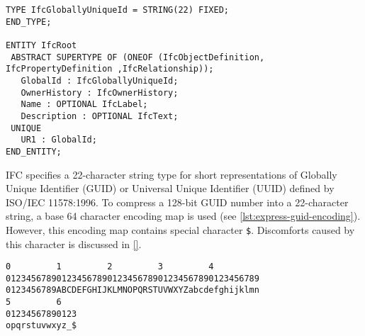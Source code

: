 \begin{lstlisting}[caption={Definition and use of type \texttt{IfcGloballyUniqueId}},label=lst:express-guid]
TYPE IfcGloballyUniqueId = STRING(22) FIXED;
END_TYPE;

ENTITY IfcRoot
 ABSTRACT SUPERTYPE OF (ONEOF (IfcObjectDefinition, IfcPropertyDefinition ,IfcRelationship));
   GlobalId : IfcGloballyUniqueId;
   OwnerHistory : IfcOwnerHistory;
   Name : OPTIONAL IfcLabel;
   Description : OPTIONAL IfcText;
 UNIQUE
   UR1 : GlobalId;
END_ENTITY;
\end{lstlisting}



IFC specifies a 22-character string type for short representations of Globally Unique Identifier (GUID) or Universal Unique Identifier (UUID) defined by ISO/IEC 11578:1996.
To compress a 128-bit GUID number into a 22-character string, a base 64 character encoding map is used (see \autoref{lst:express-guid-encoding}). 
However, this encoding map contains special character \texttt{\$}.
Discomforts caused by this character is discussed in \ref{}.




\begin{lstlisting}[caption={IFC-GUID Base-64 character encoding mapping},label=lst:express-guid-encoding]
0         1         2         3         4         
01234567890123456789012345678901234567890123456789
0123456789ABCDEFGHIJKLMNOPQRSTUVWXYZabcdefghijklmn
5         6
01234567890123
opqrstuvwxyz_$
\end{lstlisting}